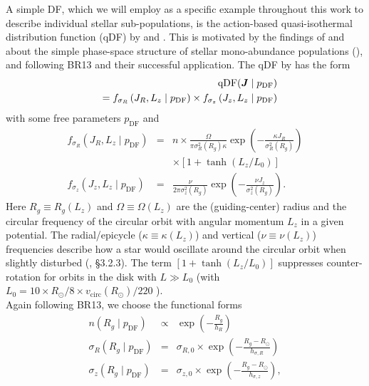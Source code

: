 A simple DF, which we will employ as a specific example throughout this work to describe individual stellar sub-populations, is the action-based quasi-isothermal distribution function (qDF) by \citet{2010MNRAS.401.2318B} and \citet{2011MNRAS.413.1889B}. This is motivated by the findings of \citet{bov12b,bov12c,2012ApJ...753..148B} and \citet{2013MNRAS.434..652T} about the simple phase-space structure of stellar mono-abundance populations (\MAP{}), and following BR13 and their successful application. The qDF by \citet{2011MNRAS.413.1889B} has the form
\begin{eqnarray}
&&\text{qDF}(\boldsymbol{J} \mid p_\text{DF}) \nonumber\\
&&= f_{\sigma_R}\left(J_R,L_z \mid p_\text{DF}\right) \times f_{\sigma_z}\left(J_z,L_z \mid p_\text{DF}\right)\label{eq:df_general}\end{eqnarray}
with some free parameters $p_\text{DF}$ and
\begin{eqnarray}
f_{\sigma_R}\left(J_R,L_z \mid p_\text{DF}\right) &=& n \times \frac{\Omega}{\pi\sigma_R^2(R_g) \kappa}\exp\left(-\frac{\kappa J_R}{\sigma_R^2(R_g)} \right) \nonumber\\
&& \times \left[1+\tanh\left(L_z/L_0\right) \right]\\
f_{\sigma_z}\left(J_z,L_z \mid p_\text{DF} \right) &=& \frac{\nu}{2 \pi \sigma_z^2(R_g)} \exp\left( -\frac{\nu J_z}{\sigma_z^2(R_g)} \right).
\end{eqnarray}
Here $R_g \equiv R_g(L_z)$ and $\Omega\equiv \Omega(L_z)$ are the (guiding-center) radius and the circular frequency of the circular orbit with angular momentum $L_z$ in a given potential. The radial/epicycle ($\kappa\equiv \kappa(L_z)$) and vertical ($\nu\equiv \nu(L_z)$) frequencies describe how a star would oscillate around the circular orbit when slightly disturbed  (\citealt{2008gady.book.....B}, \S 3.2.3). The term $\left[1+\tanh\left(L_z/L_0\right) \right]$ suppresses counter-rotation for orbits in the disk with $L \gg L_0$ (with $L_0 = 10 \times R_\odot/8 \times v_\text{circ}(R_\odot)/220$ ).
\\Again following BR13, we choose the functional forms
\begin{eqnarray}
n(R_g \mid p_\text{DF}) &\propto& \exp\left(-\frac{R_g}{h_R} \right)\\
\sigma_R(R_g \mid p_\text{DF}) &=& \sigma_{R,0} \times \exp\left(- \frac{R_g-R_\odot}{h_{\sigma,R}} \right)\label{eq:sigmaRRg}\\
\sigma_z(R_g \mid p_\text{DF}) &=& \sigma_{z,0} \times \exp\left(- \frac{R_g-R_\odot}{h_{\sigma,z}} \right)\label{eq:sigmazRg},
\end{eqnarray}
